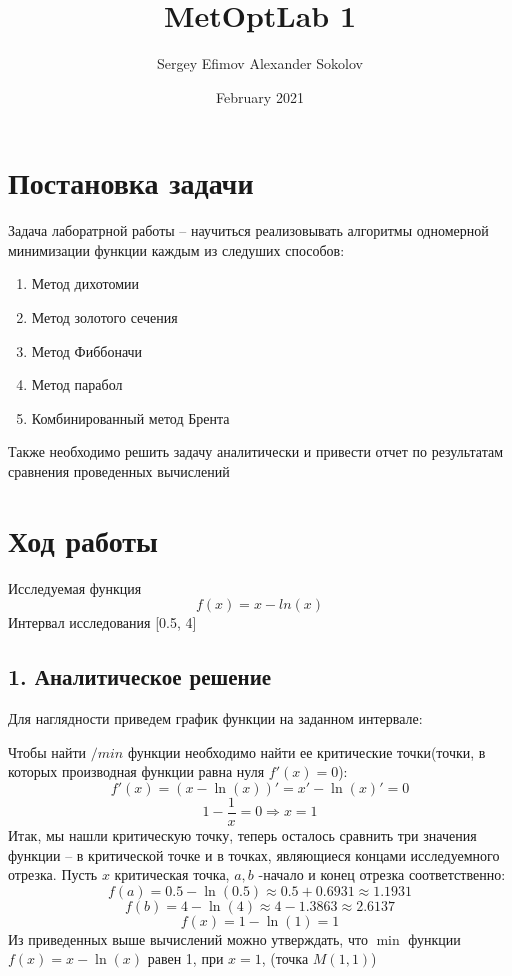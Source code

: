 \documentclass[a4paper, 42pt]{report}
\title{MetOptLab 1}
\author{Sergey Efimov Alexander Sokolov}
\date{February 2021}
\begin{document}
	\maketitle

	\section*{Постановка задачи}
	Задача лаборатрной работы  -- научиться реализовывать алгоритмы одномерной минимизации функции каждым из следуших способов:
	\begin{enumerate}
		\item Метод дихотомии
		\item Метод золотого сечения
		\item Метод Фиббоначи
		\item Метод парабол
		\item Комбинированный метод Брента
	\end{enumerate}
	Также необходимо решить задачу аналитически и привести отчет по результатам сравнения проведенных вычислений
	\section*{Ход работы}
	Исследуемая функция \[f(x) = x - ln(x)\] Интервал исследования [0.5, 4]
	\subsection*{1. Аналитическое решение}
	Для наглядности приведем график функции на заданном интервале:


	Чтобы найти $/min$ функции необходимо найти ее критические точки(точки, в которых производная функции равна нуля $f'(x) = 0$):
	\[f'(x) = (x - \ln(x))' = x' - \ln(x)' = 0\]
	\[1 - \frac{1}{x} = 0 \Rightarrow x = 1\]
	Итак, мы нашли критическую точку, теперь осталось сравнить три значения функции -- в критической точке и в точках, являющиеся концами исследуемного отрезка. Пусть $x$ критическая точка, $a, b$ -начало и конец отрезка соответственно:
	\[f(a) = 0.5 - \ln(0.5) \approx 0.5 + 0.6931  \approx 1.1931\]
	\[f(b) = 4 - \ln(4) \approx 4 - 1.3863 \approx 2.6137\]
	\[f(x) = 1 - \ln(1) = 1\]
	Из приведенных выше вычислений можно утверждать, что $\min$ функции $f(x) = x - \ln(x)$ равен 1, при $x =1$, (точка $M(1,1)$)
\end{document}
